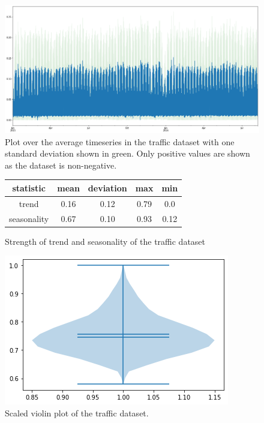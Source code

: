 \begin{figure}[htb]
  \centering
  \includegraphics[width=\linewidth]{./img/traffic_plot.png}
  \caption{Plot over the average timeseries in the traffic dataset with one standard deviation shown in green. Only positive values are shown as the dataset is non-negative.}
  \label{fig:traffic_plot}
  \endminipage\hfill
\end{figure}

\begin{figure}[htb]
  \centering
  \begin{center}
    \begin{tabular}{||c | c | c | c | c |}
      \hline
      statistic   & mean & deviation & max  & min  \\
      \hline
      trend       & 0.16 & 0.12      & 0.79 & 0.0  \\
      \hline
      seasonality & 0.67 & 0.10      & 0.93 & 0.12 \\
      \hline
      \hline
    \end{tabular}
    \caption{Strength of trend and seasonality of the traffic dataset}
  \end{center}
  \endminipage\hfill
  \includegraphics[width=\linewidth]{./img/traffic_violin.png}
  \caption{Scaled violin plot of the traffic dataset.}
  \label{fig:traffic_violin}
  \endminipage\hfill
\end{figure}

